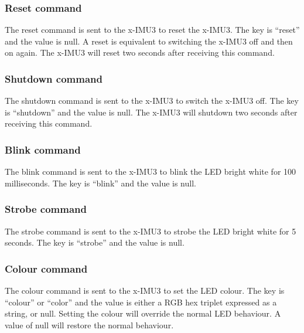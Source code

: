 \subsubsection{Reset command}

The reset command is sent to the x-IMU3 to reset the x-IMU3.  The key is \enquote{reset} and the value is null.  A reset is equivalent to switching the x-IMU3 off and then on again.  The x-IMU3 will reset two seconds after receiving this command.


\subsubsection{Shutdown command}

The shutdown command is sent to the x-IMU3 to switch the x-IMU3 off.  The key is \enquote{shutdown} and the value is null.  The x-IMU3 will shutdown two seconds after receiving this command.


\subsubsection{Blink command}
\label{sec:blinkCommand}

The blink command is sent to the x-IMU3 to blink the \ac{LED} bright white for 100 milliseconds.  The key is \enquote{blink} and the value is null.


\subsubsection{Strobe command}
\label{sec:strobeCommand}

The strobe command is sent to the x-IMU3 to strobe the \ac{LED} bright white for 5 seconds.  The key is \enquote{strobe} and the value is null.


\subsubsection{Colour command}
\label{sec:colourCommand}

The colour command is sent to the x-IMU3 to set the \ac{LED} colour.  The key is \enquote{colour} or \enquote{color} and the value is either a \ac{RGB} hex triplet expressed as a string, or null.  Setting the colour will override the normal \ac{LED} behaviour.  A value of null will restore the normal behaviour.

